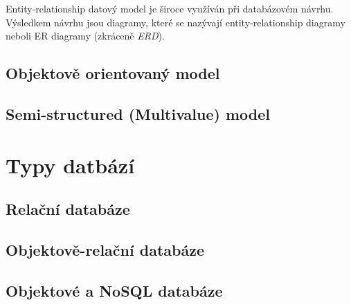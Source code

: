 Entity-relationship datový model je široce využíván při databázovém návrhu. Výsledkem návrhu jsou diagramy, které se nazývají entity-relationship diagramy neboli ER diagramy (zkráceně \emph{ERD}). 
\subsection{Objektově orientovaný model}
\subsection{Semi-structured (Multivalue) model}
\section{Typy datbází}
\subsection{Relační databáze}
\subsection{Objektově-relační databáze}
\subsection{Objektové a NoSQL databáze}
